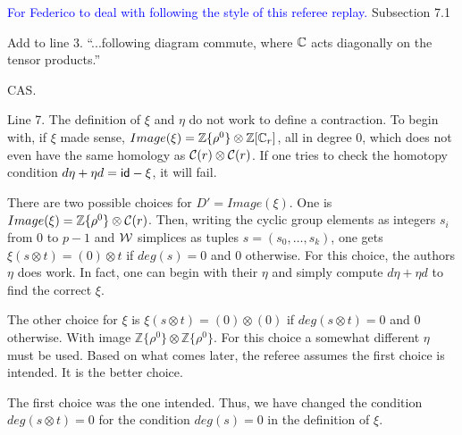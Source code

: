\textcolor{blue}{For Federico to deal with following the style of this referee replay.} Subsection 7.1

\subitem Add to line 3. ``...following diagram commute, where $\mathbb{C}$ acts diagonally on the tensor products.''

\ar CAS.

\subitem Line 7. The definition of $\xi$ and $\eta$ do not work to define a contraction. To begin with, if $\xi$ made sense, $Image(\xi) = \mathbb{Z}\{\rho^0\}\otimes \mathbb{Z}[\mathbb{C}_r]$, all in degree $0$, which does not even have the same homology as $\mathcal{C}(r)\otimes \mathcal{C}(r)$. If one tries to check the homotopy condition $d\eta+\eta d = \mathsf{id}-\xi$, it will fail.

There are two possible choices for $D'=Image(\xi)$. One is $Image(\xi) = \mathbb{Z}\{\rho^0\}\otimes \mathcal{C}(r)$. Then, writing the cyclic group elements as integers $s_i$ from $0$ to $p-1$ and $\mathcal{W}$ simplices as tuples $s = (s_0,\ldots,s_k)$, one gets $\xi(s\otimes t) = (0)\otimes t$ if $deg(s) = 0$ and $0$ otherwise. For this choice, the authors $\eta$ does work. In fact, one can begin with their $\eta$ and simply compute $d\eta+\eta d$ to find the correct $\xi$. 

The other choice for $\xi$ is $\xi(s\otimes t) = (0)\otimes (0)$ if $deg(s\otimes t)=0$ and $0$ otherwise. With image $\mathbb{Z}\{\rho^0\}\otimes \mathbb{Z}\{\rho^0\}$. For this choice a somewhat different $\eta$ must be used. Based on what comes later, the referee assumes the first choice is intended. It is the better choice.

\ar The first choice was the one intended. Thus, we have changed the condition $deg(s\otimes t) = 0$ for the condition $deg(s) = 0$ in the definition of $\xi$.